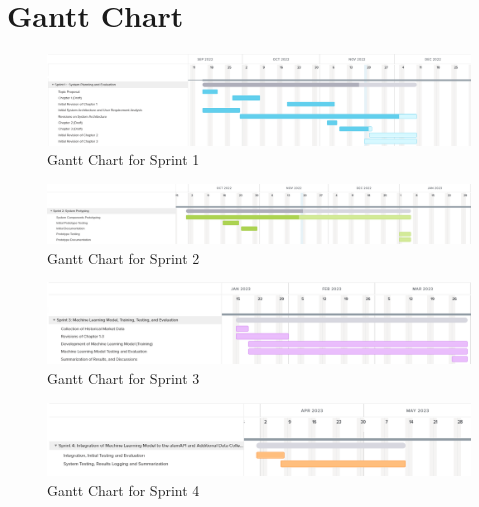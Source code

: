 \section{Gantt Chart}
\label{sec:gantt_chart}

\begin{figure}
    \centering
    \includegraphics[width=1\textwidth]{./assets/Gantt_Chart_Sprint1.png}
    \caption{Gantt Chart for Sprint 1}
    \label{fig:gantt_chart_sprint1}
\end{figure}

\begin{figure}
    \centering
    \includegraphics[width=1\textwidth]{./assets/Gantt_Chart_Sprint2.png}
    \caption{Gantt Chart for Sprint 2}
    \label{fig:gantt_chart_sprint2}
\end{figure}

\begin{figure}
    \centering
    \includegraphics[width=1\textwidth]{./assets/Gantt_Chart_Sprint3.png}
    \caption{Gantt Chart for Sprint 3}
    \label{fig:gantt_chart_sprint3}
\end{figure}

\begin{figure}
    \centering
    \includegraphics[width=1\textwidth]{./assets/Gantt_Chart_Sprint4.png}
    \caption{Gantt Chart for Sprint 4}
    \label{fig:gantt_chart_sprint4}
\end{figure}

